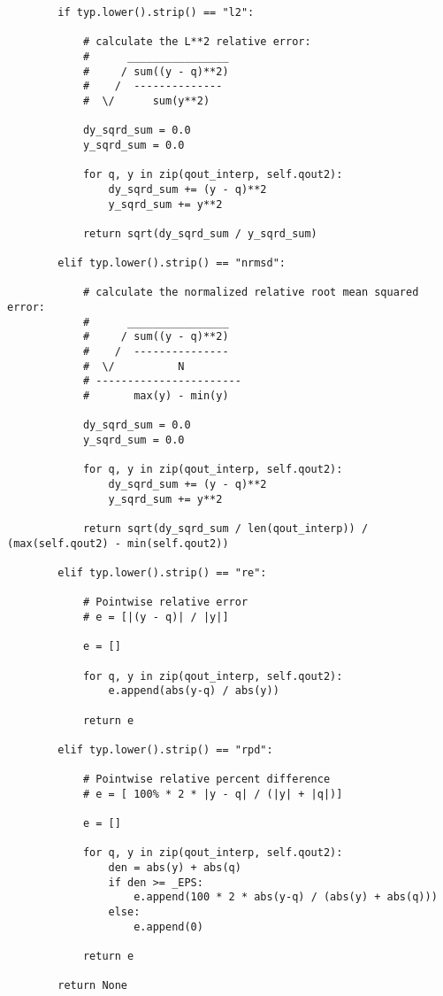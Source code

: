 \begin{lstlisting}
        if typ.lower().strip() == "l2":

            # calculate the L**2 relative error:
            #      ________________
            #     / sum((y - q)**2)
            #    /  --------------
            #  \/      sum(y**2)

            dy_sqrd_sum = 0.0
            y_sqrd_sum = 0.0

            for q, y in zip(qout_interp, self.qout2):
                dy_sqrd_sum += (y - q)**2
                y_sqrd_sum += y**2

            return sqrt(dy_sqrd_sum / y_sqrd_sum)

        elif typ.lower().strip() == "nrmsd": 

            # calculate the normalized relative root mean squared error:
            #      ________________
            #     / sum((y - q)**2)
            #    /  ---------------
            #  \/          N
            # -----------------------
            #       max(y) - min(y)

            dy_sqrd_sum = 0.0
            y_sqrd_sum = 0.0

            for q, y in zip(qout_interp, self.qout2):
                dy_sqrd_sum += (y - q)**2
                y_sqrd_sum += y**2

            return sqrt(dy_sqrd_sum / len(qout_interp)) / (max(self.qout2) - min(self.qout2))

        elif typ.lower().strip() == "re":

            # Pointwise relative error
            # e = [|(y - q)| / |y|]

            e = []

            for q, y in zip(qout_interp, self.qout2):
                e.append(abs(y-q) / abs(y))

            return e

        elif typ.lower().strip() == "rpd":

            # Pointwise relative percent difference
            # e = [ 100% * 2 * |y - q| / (|y| + |q|)]

            e = []

            for q, y in zip(qout_interp, self.qout2):
                den = abs(y) + abs(q)
                if den >= _EPS:
                    e.append(100 * 2 * abs(y-q) / (abs(y) + abs(q)))
                else:
                    e.append(0)

            return e

        return None


\end{lstlisting}
